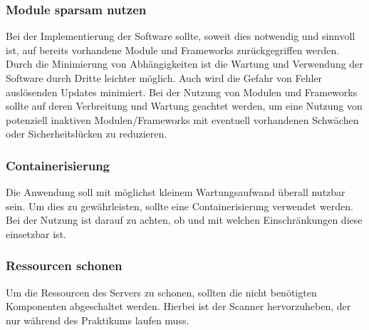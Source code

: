 \subsubsection{Module sparsam nutzen}
Bei der Implementierung der Software sollte, soweit dies notwendig und sinnvoll ist, auf bereits vorhandene Module und Frameworks zurückgegriffen werden. Durch die Minimierung von Abhängigkeiten ist die Wartung und Verwendung der Software durch Dritte leichter möglich. Auch wird die Gefahr von Fehler auslösenden Updates minimiert. Bei der Nutzung von Modulen und Frameworks sollte auf deren Verbreitung und Wartung geachtet werden, um eine Nutzung von potenziell inaktiven Modulen/Frameworks mit eventuell vorhandenen Schwächen oder Sicherheitslücken zu reduzieren.

\subsubsection{Containerisierung}
Die Anwendung soll mit möglichst kleinem Wartungsaufwand überall nutzbar sein. Um dies zu gewährleisten, sollte eine Containerisierung verwendet werden. Bei der Nutzung ist darauf zu achten, ob und mit welchen Einschränkungen diese einsetzbar ist.

\subsubsection{Ressourcen schonen}
Um die Ressourcen des Servers zu schonen, sollten die nicht benötigten Komponenten abgeschaltet werden. Hierbei ist der Scanner hervorzuheben, der nur während des Praktikums laufen muss. 
